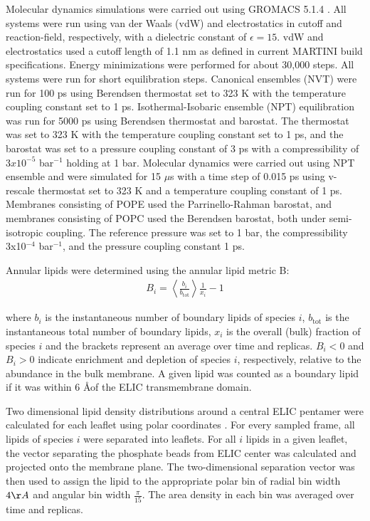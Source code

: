 Molecular dynamics simulations were carried out using GROMACS 5.1.4
\citep{Berendsen1995}. All systems were run using van der Waals (vdW) and electrostatics
in cutoff and reaction-field, respectively, with a dielectric constant
of $\epsilon = 15$. vdW and electrostatics used a cutoff length of
1.1 nm as defined in current MARTINI build specifications. Energy
minimizations were performed for about 30,000 steps. All systems were
run for short equilibration steps. Canonical ensembles (NVT) were run
for 100 ps using Berendsen thermostat set to 323 K with the temperature
coupling constant set to 1 ps. Isothermal-Isobaric ensemble (NPT)
equilibration was run for 5000 ps using Berendsen thermostat and
barostat. The thermostat was set to 323 K with the temperature coupling
constant set to 1 ps, and the barostat was set to a pressure coupling
constant of 3 ps with a compressibility of $3 x 10^{-5}$
bar$^{-1}$ holding at 1 bar. Molecular dynamics were
carried out using NPT ensemble and were simulated for 15 $\mu$s with a time
step of 0.015 ps using v-rescale thermostat set to 323 K and a
temperature coupling constant of 1 ps. Membranes consisting of POPE used
the Parrinello-Rahman barostat, and membranes consisting of POPC used
the Berendsen barostat, both under semi-isotropic coupling. The
reference pressure was set to 1 bar, the compressibility
3x10$^{-4}$ bar$^{-1}$, and the pressure
coupling constant 1 ps.

Annular lipids were determined using the annular lipid metric B:
\begin{equation}
    \begin{aligned}
    B_{i} = \left\langle \frac{b_{i}}{b_{\text{tot}}} \right\rangle\frac{1}{x_{i}} - 1
    \label{eq:B}
    \end{aligned}
\end{equation}

where $b_{i}$ is the instantaneous number of boundary lipids of
species $i$, $b_{\text{tot}}$ is the instantaneous total number of
boundary lipids, $x_{i}$ is the overall (bulk) fraction of species
$i$ and the brackets represent an average over time and replicas.
$B_{i} < 0$ and $B_{i} > 0$ indicate
enrichment and depletion of species $i$, respectively, relative to the
abundance in the bulk membrane. A given lipid was counted as a boundary
lipid if it was within 6 \AA of the ELIC transmembrane domain.

Two dimensional lipid density distributions around a central ELIC
pentamer were calculated for each leaflet using polar coordinates \citep{Sharp2019}.
For every sampled frame, all lipids of species $i$ were separated into
leaflets. For all $i$ lipids in a given leaflet, the vector separating
the phosphate beads from ELIC center was calculated and projected onto
the membrane plane. The two-dimensional separation vector was then used
to assign the lipid to the appropriate polar bin of radial bin width
$4\AA$ and angular bin width
$\frac{\pi}{15}$. The area density in each bin was averaged
over time and replicas.

